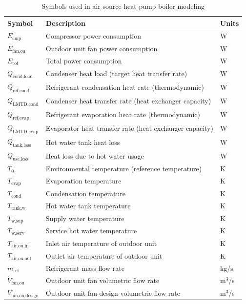 \documentclass[final,5p,times,twocolumn,authoryear]{elsarticle}
\begin{document}
\begin{table}[t]
\centering
\caption{Symbols used in air source heat pump boiler modeling}
\label{tab:hpb_symbols}
\renewcommand{\arraystretch}{1.2}
\small
\begin{tabularx}{\columnwidth}{l X l}
\toprule
\textbf{Symbol} & \textbf{Description} & \textbf{Units} \\
\midrule
$E_{\text{cmp}}$ & Compressor power consumption & W \\
$E_{\text{fan,ou}}$ & Outdoor unit fan power consumption & W \\
$E_{\text{tot}}$ & Total power consumption & W \\
$Q_{\text{cond,load}}$ & Condenser heat load (target heat transfer rate) & W \\
$Q_{\text{ref,cond}}$ & Refrigerant condensation heat rate (thermodynamic) & W \\
$Q_{\text{LMTD,cond}}$ & Condenser heat transfer rate (heat exchanger capacity) & W \\
$Q_{\text{ref,evap}}$ & Refrigerant evaporation heat rate (thermodynamic) & W \\
$Q_{\text{LMTD,evap}}$ & Evaporator heat transfer rate (heat exchanger capacity) & W \\
$Q_{\text{tank,loss}}$ & Hot water tank heat loss & W \\
$Q_{\text{use,loss}}$ & Heat loss due to hot water usage & W \\
$T_0$ & Environmental temperature (reference temperature) & K \\
$T_{\text{evap}}$ & Evaporation temperature & K \\
$T_{\text{cond}}$ & Condensation temperature & K \\
$T_{\text{tank,w}}$ & Hot water tank temperature & K \\
$T_{\text{w,sup}}$ & Supply water temperature & K \\
$T_{\text{w,serv}}$ & Service hot water temperature & K \\
$T_{\text{air,ou,in}}$ & Inlet air temperature of outdoor unit & K \\
$T_{\text{air,ou,out}}$ & Outlet air temperature of outdoor unit & K \\
$\dot{m}_{\text{ref}}$ & Refrigerant mass flow rate & kg/s \\
$\dot{V}_{\text{fan,ou}}$ & Outdoor unit fan volumetric flow rate & m$^3$/s \\
$\dot{V}_{\text{fan,ou,design}}$ & Outdoor unit fan design volumetric flow rate & m$^3$/s \\

\end{tabularx}
\end{table}
\end{document}
